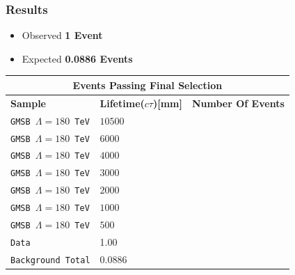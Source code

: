\documentclass{beamer}
\begin{document}
\begin{frame}
\frametitle{Results}
\begin{minipage}[t]{0.8\textwidth}
\begin{itemize}
 \item Observed \textcolor{UMN@Gold}{\textbf{1 Event}}
 \item Expected \textcolor{UMN@Maroon}{\textbf{0.0886 Events}}
\end{itemize}
\centering
\begin{tabular}{l l l}
\multicolumn{3}{c}{\bfseries{Events Passing Final Selection}} \\
  \hline
   \bfseries{Sample} &\bfseries{Lifetime($c\tau$)[mm]} &\bfseries{Number Of Events} \\
   \hline
   \texttt{GMSB $\Lambda=180$ TeV}& $10500$ & \\
   \texttt{GMSB $\Lambda=180$ TeV}& $ 6000$ &  \\
   \texttt{GMSB $\Lambda=180$ TeV}& $ 4000$&  \\
   \texttt{GMSB $\Lambda=180$ TeV}& $ 3000 $&   \\
   \texttt{GMSB $\Lambda=180$ TeV}& $ 2000$&   \\
   \texttt{GMSB $\Lambda=180$ TeV}& $ 1000$&  \\
   \texttt{GMSB $\Lambda=180$ TeV}& $ 500$&  \\
   \hline
   \texttt{Data} & 1.00 &    \\
   \texttt{Background Total} & $0.0886$ & \\
  \hline \hline
 \end{tabular} 
 \end{minipage}
\end{frame}
\end{document}
